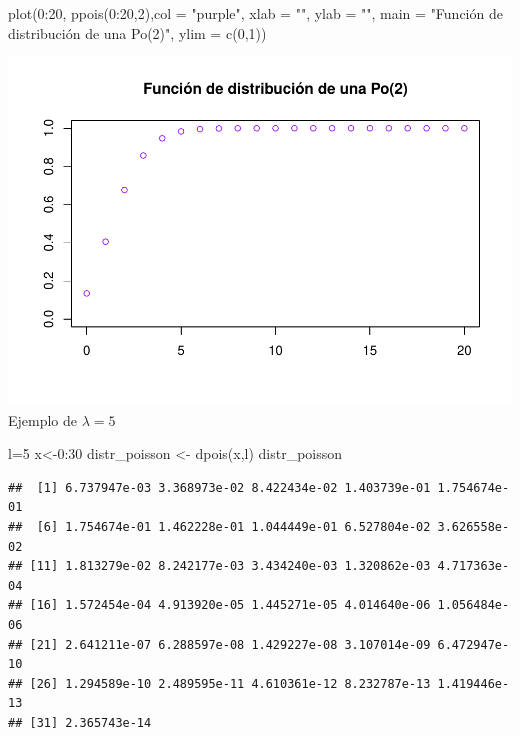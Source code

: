 \documentclass[
]{article}
\newenvironment{Shaded}{\begin{snugshade}}{\end{snugshade}}
\newcommand{\AttributeTok}[1]{\textcolor[rgb]{0.77,0.63,0.00}{#1}}
\newcommand{\DecValTok}[1]{\textcolor[rgb]{0.00,0.00,0.81}{#1}}
\newcommand{\FunctionTok}[1]{\textcolor[rgb]{0.00,0.00,0.00}{#1}}
\newcommand{\NormalTok}[1]{#1}
\newcommand{\OtherTok}[1]{\textcolor[rgb]{0.56,0.35,0.01}{#1}}
\newcommand{\SpecialCharTok}[1]{\textcolor[rgb]{0.00,0.00,0.00}{#1}}
\newcommand{\StringTok}[1]{\textcolor[rgb]{0.31,0.60,0.02}{#1}}
\begin{document}
\begin{Shaded}
\begin{Highlighting}[]
\FunctionTok{plot}\NormalTok{(}\DecValTok{0}\SpecialCharTok{:}\DecValTok{20}\NormalTok{, }\FunctionTok{ppois}\NormalTok{(}\DecValTok{0}\SpecialCharTok{:}\DecValTok{20}\NormalTok{,}\DecValTok{2}\NormalTok{),}\AttributeTok{col =} \StringTok{"purple"}\NormalTok{, }\AttributeTok{xlab =} \StringTok{""}\NormalTok{, }\AttributeTok{ylab =} \StringTok{""}\NormalTok{, }\AttributeTok{main =} \StringTok{"Función de distribución de una Po(2)"}\NormalTok{, }\AttributeTok{ylim =} \FunctionTok{c}\NormalTok{(}\DecValTok{0}\NormalTok{,}\DecValTok{1}\NormalTok{))}
\end{Highlighting}
\end{Shaded}

\includegraphics{Teoria4_files/figure-latex/Distribucion de Poisson-2.pdf}
Ejemplo de \(\lambda=5\)

\begin{Shaded}
\begin{Highlighting}[]
\NormalTok{l}\OtherTok{=}\DecValTok{5}
\NormalTok{x}\OtherTok{\textless{}{-}}\DecValTok{0}\SpecialCharTok{:}\DecValTok{30}
\NormalTok{distr\_poisson }\OtherTok{\textless{}{-}} \FunctionTok{dpois}\NormalTok{(x,l)}
\NormalTok{distr\_poisson}
\end{Highlighting}
\end{Shaded}

\begin{verbatim}
##  [1] 6.737947e-03 3.368973e-02 8.422434e-02 1.403739e-01 1.754674e-01
##  [6] 1.754674e-01 1.462228e-01 1.044449e-01 6.527804e-02 3.626558e-02
## [11] 1.813279e-02 8.242177e-03 3.434240e-03 1.320862e-03 4.717363e-04
## [16] 1.572454e-04 4.913920e-05 1.445271e-05 4.014640e-06 1.056484e-06
## [21] 2.641211e-07 6.288597e-08 1.429227e-08 3.107014e-09 6.472947e-10
## [26] 1.294589e-10 2.489595e-11 4.610361e-12 8.232787e-13 1.419446e-13
## [31] 2.365743e-14
\end{verbatim}
\end{document}
